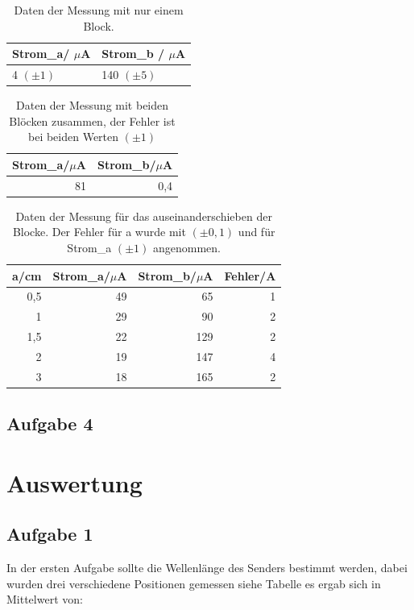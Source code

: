 \documentclass[12pt]{scrartcl}
\begin{document}
\begin{table}[htbp]
\caption{Daten der Messung mit nur einem Block.}
\begin{tabular}{|l|l|}
\hline
Strom\_a/ $\mu$A & Strom\_b / $\mu$A \\ \hline
4 $(\pm1)$ & 140 $(\pm 5)$ \\ \hline
\end{tabular}
\label{tab:a_3_e}
\end{table}

\begin{table}[H]
\caption{Daten der Messung mit beiden Blöcken zusammen, der Fehler ist bei beiden Werten $(\pm 1)$}
\begin{tabular}{|l|l|}
\hline
Strom\_a/$\mu$A & Strom\_b/$\mu$A \\ \hline
\multicolumn{1}{|r|}{81} & \multicolumn{1}{r|}{0,4} \\ \hline
\end{tabular}
\label{tab:a_3_z}
\end{table}

\begin{table}[htbp]
\caption{Daten der Messung für das auseinanderschieben der Blocke.  Der Fehler für a wurde mit $(\pm 0,1)$ und für Strom\_a $(\pm 1)$ angenommen.}
\begin{tabular}{|r|r|r|r|}
\hline
\multicolumn{1}{|l|}{a/cm} & \multicolumn{1}{l|}{Strom\_a/$\mu$A} & \multicolumn{1}{l|}{Strom\_b/$\mu$A} & \multicolumn{1}{l|}{Fehler/A} \\ \hline
0,5 & 49 & 65 & 1 \\ \hline
1 & 29 & 90 & 2 \\ \hline
1,5 & 22 & 129 & 2 \\ \hline
2 & 19 & 147 & 4 \\ \hline
3 & 18 & 165 & 2 \\ \hline
\end{tabular}
\label{tab:a_3_m}
\end{table}

\subsection{Aufgabe 4}







\section{Auswertung}
\subsection{Aufgabe 1}
In der ersten Aufgabe sollte die Wellenlänge des Senders bestimmt werden, dabei wurden drei verschiedene Positionen gemessen siehe Tabelle  %
es ergab sich in Mittelwert von:
\end{document}
